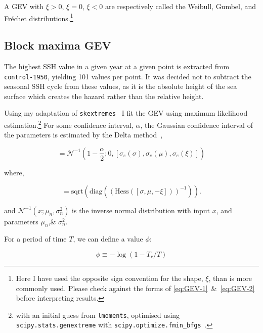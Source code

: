     A GEV with $\xi>0$, $\xi=0$, $\xi<0$ are
    respectively called the Weibull, Gumbel, and Fr\'echet
    distributions.\footnote{Here I have used the opposite sign convention for
    the shape, $\xi$, than is more commonly used. Please check against the
    forms of \ref{eq:GEV-1}~\&~\ref{eq:GEV-2} before interpreting results. }

\subsection{Block maxima GEV}
The highest SSH value in a given year at a given point
is extracted from \texttt{control-1950}, yielding 101 values per point.
It was decided not to subtract the seasonal SSH cycle from these
values, as it is the absolute height of the sea surface which
creates the hazard rather than the relative height.






Using my adaptation of \texttt{skextremes}~\cite{skextremes} I fit the
GEV using maximum likelihood estimation.\footnote{with an initial guess from \texttt{lmoments}, optimised using
\texttt{scipy.stats.genextreme} with \texttt{scipy.optimize.fmin\_bfgs}~\cite{2020SciPy-NMeth}.}
For some confidence interval, $\alpha$, the Gaussian confidence interval of the parameters is
estimated by the Delta method~\cite{coles2001introduction},

\begin{equation}
[\Delta \sigma , \Delta \mu, \Delta \xi] =
\mathcal{N}^{-1}(1-\frac{\alpha}{2}; 0, [\sigma_e (\sigma), \sigma_e (\mu), \sigma_e (\xi)])
\end{equation}

where,

\begin{equation}
[\sigma_e (\sigma), \sigma_e (\mu), \sigma_e (\xi)] =
\mathrm{sqrt}\left(\mathrm{diag}\left(\left( \mathrm{Hess}([\sigma, \mu, -\xi]) \right)^{-1} \right)\right).
\end{equation}

and $\mathcal{N}^{-1}(x; \mu_n, \sigma_n^2)$ is the inverse normal distribution
with input $x$, and parameters $\mu_n$,\& $\sigma_n^2$.

For a period of time $T$, we can define a value $\phi$:

\begin{equation}
\phi \equiv - \log(1 - T_{r}/T)
\end{equation}

